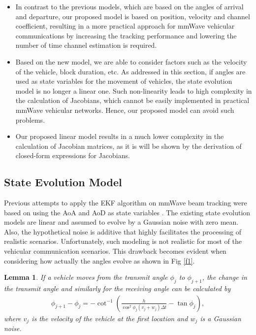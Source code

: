 \documentclass{ieeeaccess}
\newtheorem{thm}{Lemma}
\begin{document}
\begin{itemize}
  \item In contrast to the previous models, which are based on the angles of arrival and departure, our proposed model is based on position, velocity and channel coefficient, resulting in a more practical approach for mmWave vehicular communications by increasing the tracking performance and lowering the number of time channel estimation is required.
  \item Based on the new model, we are able to consider factors such as the velocity of the vehicle, block duration, etc. As addressed in this section, if angles are used as state variables for the movement of vehicles, the state evolution model is no longer a linear one. Such non-linearity leads to high complexity in the calculation of Jacobians, which cannot be easily implemented in practical mmWave vehicular networks. Hence, our proposed model can avoid such problems.
  \item Our proposed linear model results in a much lower complexity in the calculation of Jacobian matrices, as it is will be shown by the derivation of closed-form expressions for Jacobians.\\
\end{itemize}

\subsection{State Evolution Model}
Previous attempts to apply the EKF algorithm on mmWave beam tracking were based on using the AoA and AoD as state variables \cite{zhang,rh_track}. The existing state evolution models are linear and assumed to evolve by a Gaussian noise with zero mean. Also, the hypothetical noise is additive that highly facilitates the processing of realistic scenarios. Unfortunately, such modeling is not realistic for most of the vehicular communication scenarios. This drawback becomes evident when considering how actually the angles evolve as shown in Fig \ref{f1}.

\begin{thm}
If a vehicle moves from the transmit angle $\phi_{j}$ to $\phi_{j+1}$, the change in the transmit angle and similarly for the receiving angle can be calculated by
\begin{align} \label{n34}
\phi_{j+1}-\phi_{j} = -\cot^{-1}(\frac{h}{\cos^2\phi_{j}(v_j +w_j)\Delta t} - \tan\phi_{j}),
\end{align}
where $v_j$ is the velocity of the vehicle at the first location and $w_j$ is a Gaussian noise.
\end{thm}
\end{document}
